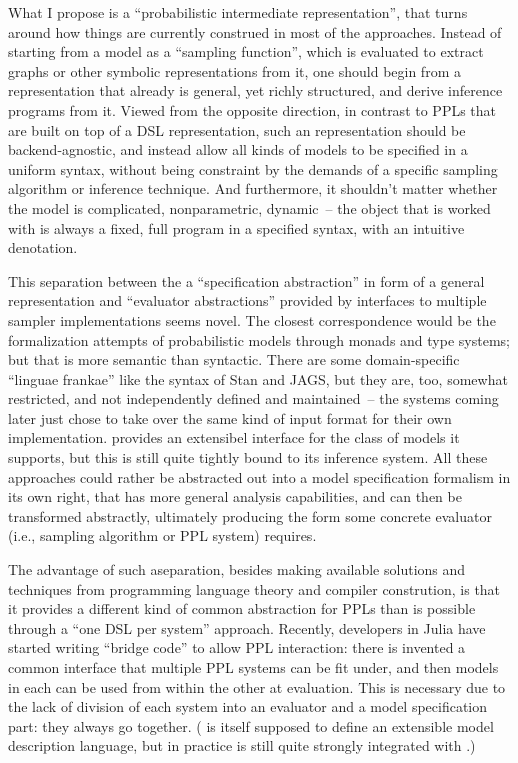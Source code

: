 What I propose is a \enquote{probabilistic intermediate representation}, that turns around how
things are currently construed in most of the approaches.  Instead of starting from a model as a
\enquote{sampling function}, which is evaluated to extract graphs or other symbolic representations
from it, one should begin from a representation that already is general, yet richly structured, and
derive inference programs from it.  Viewed from the opposite direction, in contrast to PPLs that are
built on top of a DSL representation, such an representation should be backend-agnostic, and instead
allow all kinds of models to be specified in a uniform syntax, without being constraint by the
demands of a specific sampling algorithm or inference technique.  And furthermore, it shouldn't
matter whether the model is complicated, nonparametric, dynamic~-- the object that is worked with is
always a fixed, full program in a specified syntax, with an intuitive denotation.

This separation between the a \enquote{specification abstraction} in form of a general
representation and \enquote{evaluator abstractions} provided by interfaces to multiple sampler
implementations seems novel.  The closest correspondence would be the formalization attempts of
probabilistic models through monads and type systems; but that is more semantic than syntactic.
There are some domain-specific \enquote{linguae frankae} like the syntax of Stan and JAGS, but they
are, too, somewhat restricted, and not independently defined and maintained~-- the systems coming
later just chose to take over the same kind of input format for their own implementation.
 \parencite{cusumano-towner2020gen} provides an extensibel interface for the
class of models it supports, but this is still quite tightly bound to its inference system.  All
these approaches could rather be abstracted out into a model specification formalism in its own
right, that has more general analysis capabilities, and can then be transformed abstractly,
ultimately producing the form some concrete evaluator (i.e., sampling algorithm or PPL system)
requires.

The advantage of such aseparation, besides making available solutions and techniques from
programming language theory and compiler constrution, is that it provides a different kind of common
abstraction for PPLs than is possible through a \enquote{one DSL per system} approach.  Recently,
developers in Julia have started writing \enquote{bridge code} to allow PPL interaction: there is
invented a common interface that multiple PPL systems can be fit under, and then models in each can
be used from within the other at evaluation.  This is necessary due to the lack of division of each
system into an evaluator and a model specification part: they always go together.  (\dppljl{} is
itself supposed to define an extensible model description language, but in practice is still quite
strongly integrated with \turingjl{}.)

